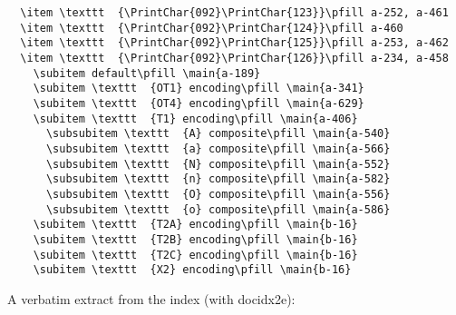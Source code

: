 \documentclass[twoside]{ltxdoc}
\makeatletter
\renewenvironment{theindex}{%
   \@restonecoltrue
   \if@twocolumn\@restonecolfalse\fi
   \columnseprule \z@
   \columnsep 35\p@
   \twocolumn[\index@prologue]%
   \IndexParms
   \let\item\@idxitem
   \ignorespaces
}{\if@restonecol\onecolumn\else\clearpage\fi}
\makeatother
\begin{document}
\begin{theindex}
\begin{figure*}
\begin{list}{}{\setlength{\leftmargin}{-0.5\marginparwidth}}
\begin{verbatim}
  \item \texttt  {\PrintChar{092}\PrintChar{123}}\pfill a-252, a-461
  \item \texttt  {\PrintChar{092}\PrintChar{124}}\pfill a-460
  \item \texttt  {\PrintChar{092}\PrintChar{125}}\pfill a-253, a-462
  \item \texttt  {\PrintChar{092}\PrintChar{126}}\pfill a-234, a-458
    \subitem default\pfill \main{a-189}
    \subitem \texttt  {OT1} encoding\pfill \main{a-341}
    \subitem \texttt  {OT4} encoding\pfill \main{a-629}
    \subitem \texttt  {T1} encoding\pfill \main{a-406}
      \subsubitem \texttt  {A} composite\pfill \main{a-540}
      \subsubitem \texttt  {a} composite\pfill \main{a-566}
      \subsubitem \texttt  {N} composite\pfill \main{a-552}
      \subsubitem \texttt  {n} composite\pfill \main{a-582}
      \subsubitem \texttt  {O} composite\pfill \main{a-556}
      \subsubitem \texttt  {o} composite\pfill \main{a-586}
    \subitem \texttt  {T2A} encoding\pfill \main{b-16}
    \subitem \texttt  {T2B} encoding\pfill \main{b-16}
    \subitem \texttt  {T2C} encoding\pfill \main{b-16}
    \subitem \texttt  {X2} encoding\pfill \main{b-16}
\end{verbatim}
    \end{list}
  \end{figure*}
  \begin{figure*}
    A verbatim extract from the index (with \textsf{docidx2e}):
    

\end{figure*}
\end{theindex}
\end{document}
